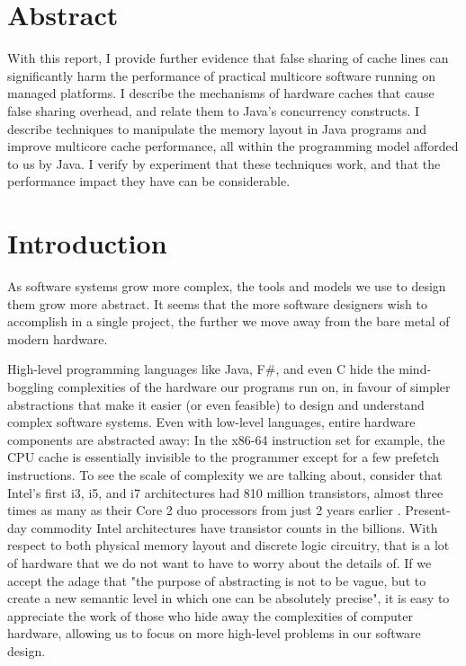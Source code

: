 \chapter{Abstract}
With this report, I provide further evidence that false sharing of cache lines
can significantly harm the performance of practical multicore software running
on managed platforms. I describe the mechanisms of hardware caches that cause
false sharing overhead, and relate them to Java's concurrency constructs. I
describe techniques to manipulate the memory layout in Java programs and improve
multicore cache performance, all within the programming model afforded to us by
Java. I verify by experiment that these techniques work, and that the
performance impact they have can be considerable.

\chapter{Introduction}
As software systems grow more complex, the tools and models we use to design
them grow more abstract. It seems that the more software designers wish to
accomplish in a single project, the further we move away from the bare metal of
modern hardware.

High-level programming languages like Java, F\#, and even C hide the
mind-boggling complexities of the hardware our programs run on, in favour of
simpler abstractions that make it easier (or even feasible) to design and
understand complex software systems. Even with low-level languages, entire
hardware components are abstracted away: In the x86-64 instruction set for
example, the CPU cache is essentially invisible to the programmer except for a
few prefetch instructions. 
To see the scale of
complexity we are talking about, consider that Intel's first i3, i5, and i7
architectures had 810 million transistors, almost three times as many as their
Core 2 duo processors from just 2 years earlier \cite{plc}. Present-day
commodity Intel architectures have transistor counts in the billions. With
respect to both physical memory layout and discrete logic circuitry, that is a
lot of hardware that we do not want to have to worry about the details of.
If we accept the adage that "the purpose of abstracting is not to be vague, but
to create a new semantic level in which one can be absolutely
precise"\cite{dijkstra}, it is easy to appreciate the work of those who hide
away the complexities of computer hardware, allowing us to focus on more
high-level problems in our software design.

